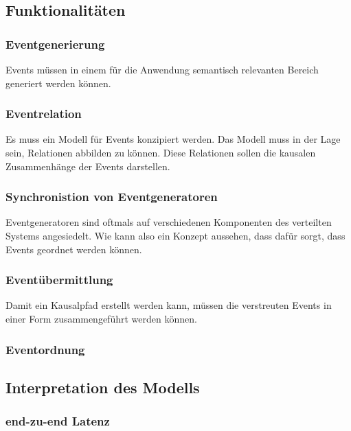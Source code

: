 \subsection{Funktionalitäten}
\subsubsection{Eventgenerierung}
\label{section:Eventgenerierung}
Events müssen in einem für die Anwendung semantisch relevanten Bereich generiert werden können. 



\subsubsection{Eventrelation}
\label{subsection:Eventkorrelation}
Es muss ein Modell für Events konzipiert werden. Das Modell muss in der Lage sein, Relationen abbilden zu können. Diese Relationen sollen die kausalen Zusammenhänge der Events darstellen. 

\subsubsection{Synchronistion von Eventgeneratoren}
\label{subsection:Synchronistion von Eventgeneratoren}
Eventgeneratoren sind oftmals auf verschiedenen Komponenten des verteilten Systems angesiedelt. Wie kann also ein Konzept aussehen, dass dafür sorgt, dass Events geordnet werden können.

\subsubsection{Eventübermittlung}
\label{section:Eventübermittlung}
Damit ein Kausalpfad erstellt werden kann, müssen die verstreuten Events in einer Form zusammengeführt werden können.

\subsubsection{Eventordnung}

\subsection{Interpretation des Modells}

\subsubsection{end-zu-end Latenz}


